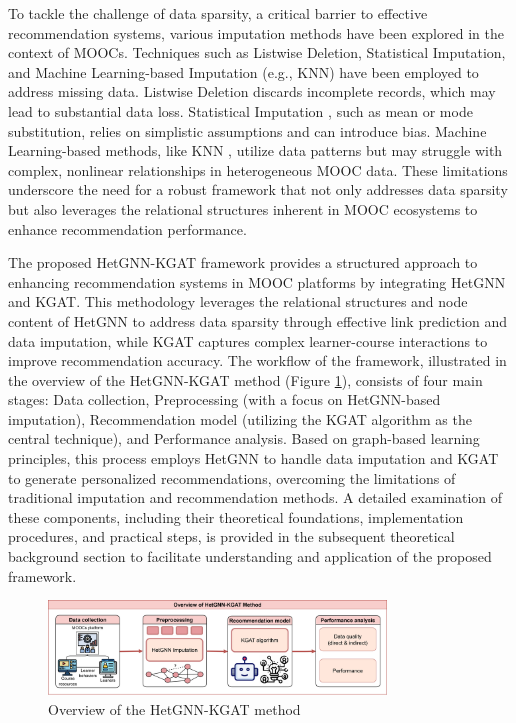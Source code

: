 \documentclass{ieeeaccess}
\begin{document}
To tackle the challenge of data sparsity, a critical barrier to effective recommendation systems, various imputation methods have been explored in the context of MOOCs. Techniques such as Listwise Deletion, Statistical Imputation, and Machine Learning-based Imputation (e.g., KNN) have been employed to address missing data. Listwise Deletion \cite{Rubin2019statistical_analysis_missing_data} discards incomplete records, which may lead to substantial data loss. Statistical Imputation \cite{van2011mice}, such as mean or mode substitution, relies on simplistic assumptions and can introduce bias. Machine Learning-based methods, like KNN \cite{troyanskaya2001missingDNA}, utilize data patterns but may struggle with complex, nonlinear relationships in heterogeneous MOOC data. These limitations underscore the need for a robust framework that not only addresses data sparsity but also leverages the relational structures inherent in MOOC ecosystems to enhance recommendation performance.

The proposed HetGNN-KGAT framework provides a structured approach to enhancing recommendation systems in MOOC platforms by integrating HetGNN and KGAT. This methodology leverages the relational structures and node content of HetGNN to address data sparsity through effective link prediction and data imputation, while KGAT captures complex learner-course interactions to improve recommendation accuracy. The workflow of the framework, illustrated in the overview of the HetGNN-KGAT method (Figure \ref{fig:overview_hetgnn_kgat_method}), consists of four main stages: Data collection, Preprocessing (with a focus on HetGNN-based imputation), Recommendation model (utilizing the KGAT algorithm as the central technique), and Performance analysis. Based on graph-based learning principles, this process employs HetGNN to handle data imputation and KGAT to generate personalized recommendations, overcoming the limitations of traditional imputation and recommendation methods. A detailed examination of these components, including their theoretical foundations, implementation procedures, and practical steps, is provided in the subsequent theoretical background section to facilitate understanding and application of the proposed framework.

\begin{figure}[h]
\centering
\includegraphics[width=0.8\textwidth]{imgs/overview.png}
\caption{Overview of the HetGNN-KGAT method}
\label{fig:overview_hetgnn_kgat_method}
\end{figure}
\end{document}
